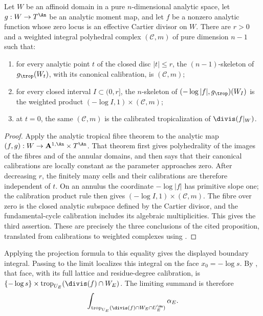 
\begin{lemma}
\label{lem:ch18-fibre-cylinder}
Let $W$ be an affinoid domain in a pure $n$-dimensional analytic space,
let $g:W\to T^{\An}$ be an analytic moment map, and let $f$ be a nonzero
analytic function whose zero locus is an effective Cartier divisor on $W$.
There are $r>0$ and a weighted integral polyhedral complex $(\mathscr C,m)$
of pure dimension $n-1$ such that:
\begin{enumerate}
\item for every analytic point $t$ of the closed disc $|t|\leq r$, the
 $(n-1)$-skeleton of $g_{\trop}(W_t)$, with its canonical calibration, is
 $(\mathscr C,m)$;
\item for every closed interval $I\subset(0,r]$, the $n$-skeleton of
 $(-\log|f|,g_{\trop})(W_I)$ is the weighted product
 $(-\log I,1)\times(\mathscr C,m)$;
\item at $t=0$, the same $(\mathscr C,m)$ is the calibrated
 tropicalization of $\divis(f|_W)$.
\end{enumerate}
\end{lemma}

\begin{proof}
Apply the analytic tropical fibre theorem
\cite[Proposition~4.6.6]{CLD25} to the analytic map
$(f,g):W\to\mathbf A^{1,\An}\times T^{\An}$.  That theorem first gives
polyhedrality of the images of the fibres and of the annular domains, and
then says that their canonical calibrations are locally constant as the
parameter approaches zero.  After decreasing $r$, the finitely many cells
and their calibrations are therefore independent of $t$.  On an annulus the
coordinate $-\log|f|$ has primitive slope one; the calibration product rule
then gives $(-\log I,1)\times(\mathscr C,m)$.  The fibre over zero is the
closed analytic subspace defined by the Cartier divisor, and the
fundamental-cycle calibration includes its algebraic multiplicities.  This
gives the third assertion.  These are precisely the three conclusions of
the cited proposition, translated from calibrations to weighted complexes
using .
\end{proof}

Applying the projection formula to this equality gives the displayed
boundary integral.  Passing to the limit
localizes this integral on the face $x_0=-\log s$.  By
, that face, with its full lattice and
residue-degree calibration, is
\(
 \{-\log s\}\times
 \operatorname{trop}_{U_E}(\divis(f)\cap W_E)
\).
The limiting summand is therefore
\[
        \int_{\operatorname{trop}_{U_E}
          (\divis(f)\cap W_E\cap U_E^{\An})}\alpha_E .
\]
